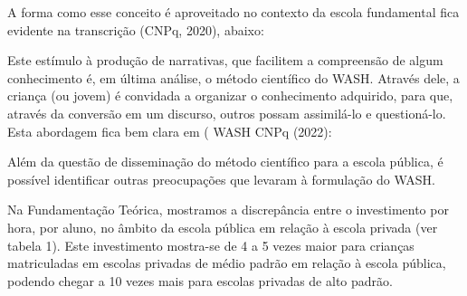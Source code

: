 A forma como esse conceito é aproveitado no contexto da escola fundamental fica evidente na transcrição (CNPq, 2020), abaixo:


\noindent\begin{center}\mbox{\centering{}}\end{center}


Este estímulo à produção de narrativas, que facilitem a compreensão de algum conhecimento é, em última análise, o método científico do WASH. Através dele, a criança (ou jovem) é convidada a organizar o conhecimento adquirido, para que, através da conversão em um discurso, outros possam assimilá-lo e questioná-lo. Esta abordagem fica bem clara em ( WASH CNPq (2022):


\noindent\begin{center}\mbox{\centering{}}\end{center}


Além da questão de disseminação do método científico para a escola pública, é possível identificar outras preocupações que levaram à formulação do WASH.

Na Fundamentação Teórica, mostramos a discrepância entre o investimento por hora, por aluno, no âmbito da escola pública em relação à escola privada (ver tabela 1). Este investimento mostra-se de 4 a 5 vezes maior para crianças matriculadas em escolas privadas de médio padrão em relação à escola pública, podendo chegar a 10 vezes mais para escolas privadas de alto padrão.

